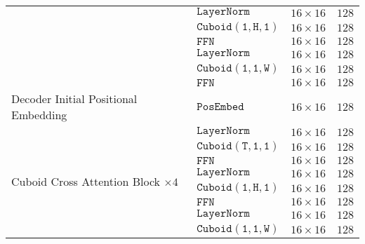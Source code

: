 \documentclass{article}
\begin{document}
\begin{table}[!tb]
\begin{center}
{\begin{tabular}{l|l|c|c}
                                                        & $\mathtt{LayerNorm}$      & $16\times16$                      & $128$             \\
                                                        & $\mathtt{Cuboid(1,H,1)}$  & $16\times16$                      & $128$             \\
                                                        & $\mathtt{FFN}$            & $16\times16$                      & $128$             \\
                                                        & $\mathtt{LayerNorm}$      & $16\times16$                      & $128$             \\
                                                        & $\mathtt{Cuboid(1,1,W)}$  & $16\times16$                      & $128$             \\
                                                        & $\mathtt{FFN}$            & $16\times16$                      & $128$             \\\hline
    \midrule
    Decoder Initial Positional Embedding                & $\mathtt{PosEmbed}$       & $16\times16$                      & $128$             \\\hline
    \multirow{12}{*}{Cuboid Cross Attention Block $\times 4$}& $\mathtt{LayerNorm}$      & $16\times16$                 & $128$             \\
                                                        & $\mathtt{Cuboid(T,1,1)}$  & $16\times16$                      & $128$             \\
                                                        & $\mathtt{FFN}$            & $16\times16$                      & $128$             \\
                                                        & $\mathtt{LayerNorm}$      & $16\times16$                      & $128$             \\
                                                        & $\mathtt{Cuboid(1,H,1)}$  & $16\times16$                      & $128$             \\
                                                        & $\mathtt{FFN}$            & $16\times16$                      & $128$             \\
                                                        & $\mathtt{LayerNorm}$      & $16\times16$                      & $128$             \\
                                                        & $\mathtt{Cuboid(1,1,W)}$  & $16\times16$                      & $128$             \\

\end{tabular}}
\end{center}
\end{table}
\end{document}
